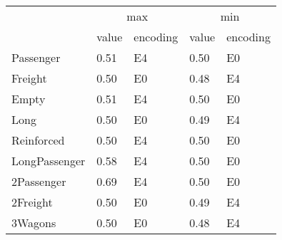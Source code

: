 \begin{tabular}{lllll}
\toprule
 & \multicolumn{2}{c}{max} & \multicolumn{2}{c}{min} \\
 & value & encoding & value & encoding \\
\midrule
Passenger & 0.51 & E4 & 0.50 & E0 \\
Freight & 0.50 & E0 & 0.48 & E4 \\
Empty & 0.51 & E4 & 0.50 & E0 \\
Long & 0.50 & E0 & 0.49 & E4 \\
Reinforced & 0.50 & E4 & 0.50 & E0 \\
LongPassenger & 0.58 & E4 & 0.50 & E0 \\
2Passenger & 0.69 & E4 & 0.50 & E0 \\
2Freight & 0.50 & E0 & 0.49 & E4 \\
3Wagons & 0.50 & E0 & 0.48 & E4 \\
\bottomrule
\end{tabular}
